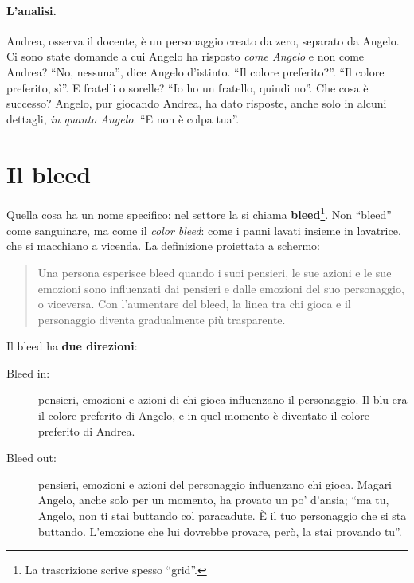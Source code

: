 \paragraph{L'analisi.} Andrea, osserva il docente, è un personaggio creato da zero,
separato da Angelo. Ci sono state domande a cui Angelo ha risposto \emph{come
Angelo} e non come Andrea? ``No, nessuna'', dice Angelo d'istinto. ``Il colore
preferito?''. ``Il colore preferito, sì''. E fratelli o sorelle? ``Io ho un
fratello, quindi no''. Che cosa è successo? Angelo, pur giocando Andrea, ha dato
risposte, anche solo in alcuni dettagli, \emph{in quanto Angelo}. ``E non è colpa
tua''.

\section{Il bleed}
\label{a5:sec:bleed}



Quella cosa ha un nome specifico: nel settore la si chiama
\textbf{bleed}\footnote{La trascrizione scrive spesso ``grid''.}. Non ``bleed'' come
sanguinare, ma come il \emph{color bleed}: come i panni lavati insieme in lavatrice,
che si macchiano a vicenda. La definizione proiettata a schermo:

\begin{quote}
Una persona esperisce bleed quando i suoi pensieri, le sue azioni e le sue emozioni
sono influenzati dai pensieri e dalle emozioni del suo personaggio, o viceversa. Con
l'aumentare del bleed, la linea tra chi gioca e il personaggio diventa
gradualmente più trasparente.
\end{quote}

Il bleed ha \textbf{due direzioni}:
\begin{description}
  \item[Bleed in:] pensieri, emozioni e azioni di chi gioca influenzano il
        personaggio. Il blu era il colore preferito di Angelo, e in quel momento è
        diventato il colore preferito di Andrea.
  \item[Bleed out:] pensieri, emozioni e azioni del personaggio influenzano chi
        gioca. Magari Angelo, anche solo per un momento, ha provato un po' d'ansia;
        ``ma tu, Angelo, non ti stai buttando col paracadute. È il tuo personaggio
        che si sta buttando. L'emozione che lui dovrebbe provare, però, la stai
        provando tu''.
\end{description}


